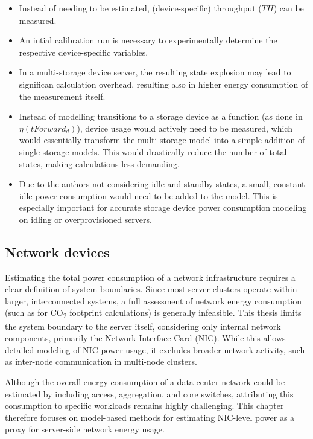\begin{itemize}
    \item Instead of needing to be estimated, (device-specific) throughput ($TH$) can be measured.
    \item An intial calibration run is necessary to experimentally determine the respective device-specific variables.
    \item In a multi-storage device server, the resulting state explosion may lead to significan calculation overhead, resulting also in higher energy consumption of the measurement itself.
    \item Instead of modelling transitions to a storage device as a function (as done in $\eta(tForward_d)$), device usage would actively need to be measured, which would essentially transform the multi-storage model into a simple addition of single-storage models. This would drastically reduce the number of total states, making calculations less demanding.
    \item Due to the authors not considering idle and standby-states, a small, constant idle power consumption would need to be added to the model. This is especially important for accurate storage device power consumption modeling on idling or overprovisioned servers.
\end{itemize}

\subsection{Network devices}
\label{sec:NIC_modeling}
Estimating the total power consumption of a network infrastructure requires a clear definition of system boundaries. Since most server clusters operate within larger, interconnected systems, a full assessment of network energy consumption (such as for CO\textsubscript{2} footprint calculations) is generally infeasible. This thesis limits the system boundary to the server itself, considering only internal network components, primarily the Network Interface Card (NIC). While this allows detailed modeling of NIC power usage, it excludes broader network activity, such as inter-node communication in multi-node clusters.

Although the overall energy consumption of a data center network could be estimated by including access, aggregation, and core switches, attributing this consumption to specific workloads remains highly challenging. This chapter therefore focuses on model-based methods for estimating NIC-level power as a proxy for server-side network energy usage.

